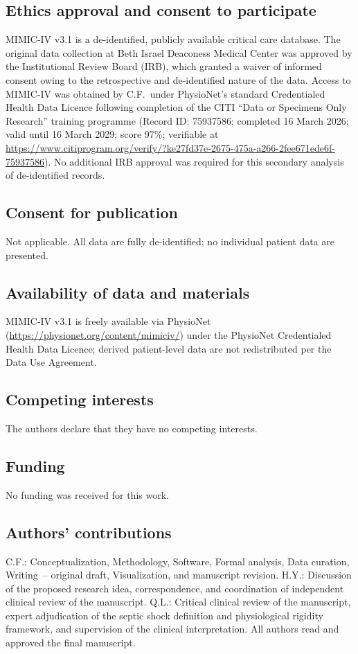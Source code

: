 \documentclass[referee,lineno,pdflatex]{sn-article-template/sn-jnl}
\begin{document}
\subsection*{Ethics approval and consent to participate}
MIMIC-IV v3.1 is a de-identified, publicly available critical care database.
The original data collection at Beth Israel Deaconess Medical Center was
approved by the Institutional Review Board (IRB), which granted a waiver of
informed consent owing to the retrospective and de-identified nature of the
data.
Access to MIMIC-IV was obtained by C.F.\ under PhysioNet's standard
Credentialed Health Data Licence following completion of the CITI
``Data or Specimens Only Research'' training programme
(Record ID: 75937586; completed 16 March 2026; valid until 16 March 2029;
score 97\%; verifiable at
\url{https://www.citiprogram.org/verify/?ke27fd37e-2675-475a-a266-2fee671ede6f-75937586}).
No additional IRB approval was required for this secondary analysis of
de-identified records.

\subsection*{Consent for publication}
Not applicable. All data are fully de-identified; no individual patient data
are presented.

\subsection*{Availability of data and materials}
MIMIC-IV v3.1 is freely available via PhysioNet
(\url{https://physionet.org/content/mimiciv/}) under the PhysioNet
Credentialed Health Data Licence; derived patient-level data are not
redistributed per the Data Use Agreement.

\subsection*{Competing interests}
The authors declare that they have no competing interests.

\subsection*{Funding}
\label{strobe:funding}%
No funding was received for this work.

\subsection*{Authors' contributions}
C.F.: Conceptualization, Methodology, Software, Formal analysis, Data
curation, Writing~-- original draft, Visualization, and manuscript revision.
H.Y.: Discussion of the proposed research idea, correspondence, and
coordination of independent clinical review of the manuscript.
Q.L.: Critical clinical review of the manuscript, expert adjudication of
the septic shock definition and physiological rigidity framework, and
supervision of the clinical interpretation.
All authors read and approved the final manuscript.
\end{document}
